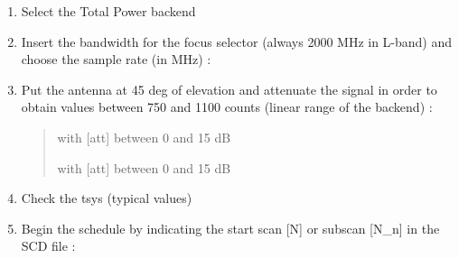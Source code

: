 \documentclass[letterpaper,10pt,english]{sphinxmanual}
\begin{document}
\begin{enumerate}
\begin{quote}
\end{quote}

\item {} 
Select the Total Power backend
\begin{quote}

\end{quote}

\item {} 
Insert the bandwidth for the focus selector (always 2000 MHz in L-band) and choose the sample rate (in MHz) :
\begin{quote}


\end{quote}

\item {} 
Put the antenna at 45 deg of elevation and attenuate the signal in order to obtain values between 750 and 1100 counts (linear range of the backend) :
\begin{quote}



        with {[}att{]} between 0 and 15 dB

        with {[}att{]} between 0 and 15 dB

\end{quote}

\item {} 
Check the tsys (typical values)
\begin{quote}

\end{quote}

\item {} 
Begin the schedule by indicating the start scan {[}N{]} or subscan {[}N\_n{]} in the SCD file :
\begin{quote}

\end{quote}

\end{enumerate}
\end{document}
